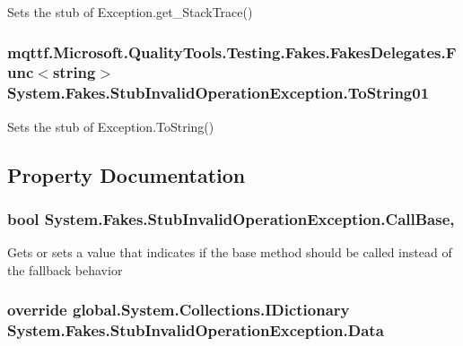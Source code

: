 Sets the stub of Exception.\-get\-\_\-\-Stack\-Trace()

\hypertarget{class_system_1_1_fakes_1_1_stub_invalid_operation_exception_a9eec35a1b6c4b67c044d3a9d5ca96e01}{
\subsubsection[{To\-String01}]{\setlength{\rightskip}{0pt plus 5cm}mqttf.\-Microsoft.\-Quality\-Tools.\-Testing.\-Fakes.\-Fakes\-Delegates.\-Func$<$string$>$ System.\-Fakes.\-Stub\-Invalid\-Operation\-Exception.\-To\-String01}}\label{class_system_1_1_fakes_1_1_stub_invalid_operation_exception_a9eec35a1b6c4b67c044d3a9d5ca96e01}


Sets the stub of Exception.\-To\-String()



\subsection{Property Documentation}
\hypertarget{class_system_1_1_fakes_1_1_stub_invalid_operation_exception_a3362afb6e24719851a5331373c84ecd6}{
\subsubsection[{Call\-Base}]{\setlength{\rightskip}{0pt plus 5cm}bool System.\-Fakes.\-Stub\-Invalid\-Operation\-Exception.\-Call\-Base\hspace{0.3cm}{\ttfamily [get]}, {\ttfamily [set]}}}\label{class_system_1_1_fakes_1_1_stub_invalid_operation_exception_a3362afb6e24719851a5331373c84ecd6}


Gets or sets a value that indicates if the base method should be called instead of the fallback behavior

\hypertarget{class_system_1_1_fakes_1_1_stub_invalid_operation_exception_ac97148727982c11aad267a13b83de7ae}{
\subsubsection[{Data}]{\setlength{\rightskip}{0pt plus 5cm}override global.\-System.\-Collections.\-I\-Dictionary System.\-Fakes.\-Stub\-Invalid\-Operation\-Exception.\-Data\hspace{0.3cm}{\ttfamily [get]}}}\label{class_system_1_1_fakes_1_1_stub_invalid_operation_exception_ac97148727982c11aad267a13b83de7ae}


